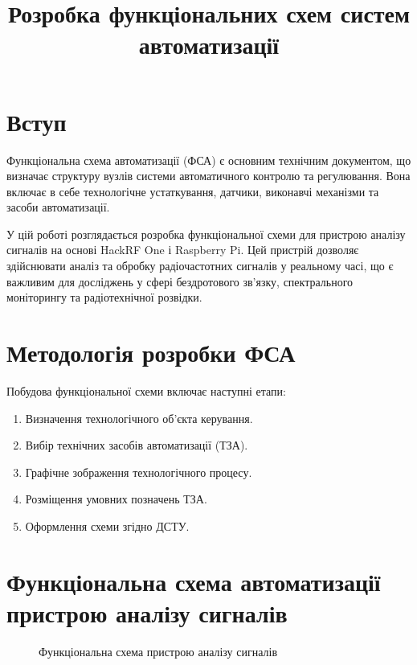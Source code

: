 \documentclass[a4paper,12pt]{article}
\title{Розробка функціональних схем систем автоматизації}
\begin{document}
\maketitle

\section{Вступ}
Функціональна схема автоматизації (ФСА) є основним технічним документом, що визначає структуру вузлів системи автоматичного контролю та регулювання. Вона включає в себе технологічне устаткування, датчики, виконавчі механізми та засоби автоматизації.

У цій роботі розглядається розробка функціональної схеми для пристрою аналізу сигналів на основі HackRF One і Raspberry Pi. Цей пристрій дозволяє здійснювати аналіз та обробку радіочастотних сигналів у реальному часі, що є важливим для досліджень у сфері бездротового зв'язку, спектрального моніторингу та радіотехнічної розвідки.

\section{Методологія розробки ФСА}
Побудова функціональної схеми включає наступні етапи:
\begin{enumerate}
    \item Визначення технологічного об'єкта керування.
    \item Вибір технічних засобів автоматизації (ТЗА).
    \item Графічне зображення технологічного процесу.
    \item Розміщення умовних позначень ТЗА.
    \item Оформлення схеми згідно ДСТУ.
\end{enumerate}

\section{Функціональна схема автоматизації пристрою аналізу сигналів}

\begin{figure}[h]
    \centering
    \caption{Функціональна схема пристрою аналізу сигналів}
    \label{fig:signal_analysis}
\end{figure}
\end{document}
